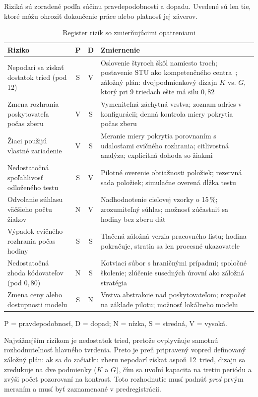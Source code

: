 Riziká sú zoradené podľa súčinu pravdepodobnosti a dopadu. Uvedené sú len tie, ktoré môžu ohroziť dokončenie práce alebo platnosť jej záverov.

\begin{table}[H]
\centering
\caption{Register rizík so zmierňujúcimi opatreniami}
\label{tab:rizika}
\scriptsize
\begin{tabularx}{\textwidth}{@{}X c c X@{}}
\toprule
\textbf{Riziko} & \textbf{P} & \textbf{D} & \textbf{Zmiernenie} \\
\midrule
Nepodarí sa získať dostatok tried (pod 12) & S & V & Oslovenie štyroch škôl namiesto troch; postavenie STU ako kompetenčného centra~\cite{drucker2026competence}; záložný plán: dvojpodmienkový dizajn $K$ vs. $G$, ktorý pri 9 triedach ešte má silu $0{,}82$ \\
Zmena rozhrania poskytovateľa počas zberu & V & S & Vymeniteľná záchytná vrstva; zoznam adries v konfigurácii; denná kontrola miery pokrytia počas zberu \\
Žiaci použijú vlastné zariadenie & V & S & Meranie miery pokrytia porovnaním s udalosťami cvičného rozhrania; citlivostná analýza; explicitná dohoda so žiakmi \\
Nedostatočná spoľahlivosť odloženého testu & S & V & Pilotné overenie obtiažnosti položiek; rezervná sada položiek; simulačne overená dĺžka testu \\
Odvolanie súhlasu väčšieho počtu žiakov & N & V & Nadhodnotenie cieľovej vzorky o 15\,\%; zrozumiteľný súhlas; možnosť zúčastniť sa hodiny bez zberu dát \\
Výpadok cvičného rozhrania počas hodiny & S & S & Tlačená záložná verzia pracovného listu; hodina pokračuje, stratia sa len procesné ukazovatele \\
Nedostatočná zhoda kódovateľov (pod $0{,}80$) & N & S & Kotviaci súbor s hraničnými prípadmi; spoločné školenie; zlúčenie susedných úrovní ako záložná stratégia \\
Zmena ceny alebo dostupnosti modelu & S & N & Vrstva abstrakcie nad poskytovateľom; rozpočet na základe pilotu; možnosť lokálneho modelu \\
\bottomrule
\end{tabularx}
\vspace{2pt}
\footnotesize P = pravdepodobnosť, D = dopad; N = nízka, S = stredná, V = vysoká.
\end{table}

Najvážnejším rizikom je nedostatok tried, pretože ovplyvňuje samotnú rozhodnuteľnosť hlavného tvrdenia. Preto je preň pripravený vopred definovaný záložný plán: ak sa do začiatku zberu nepodarí získať aspoň 12~tried, dizajn sa zredukuje na dve podmienky ($K$ a $G$), čím sa uvoľní kapacita na tretiu periódu a zvýši počet pozorovaní na kontrast. Toto rozhodnutie musí padnúť \emph{pred} prvým meraním a musí byť zaznamenané v predregistrácii.


